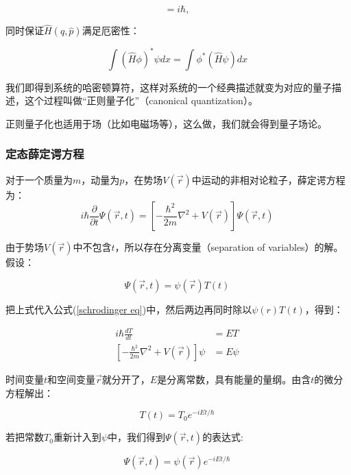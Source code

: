 \begin{equation}
[\hat x, \hat p] = i \hbar ,~
\end{equation}

同时保证$\hat H (\hat q,\hat p)$满足厄密性：

\begin{equation}
\int (\hat H \phi)^* \psi dx = \int \phi^* (\hat H \psi) dx~
\end{equation}

我们即得到系统的哈密顿算符，这样对系统的一个经典描述就变为对应的量子描述，这个过程叫做“正则量子化”（canonical quantization）。

正则量子化也适用于场（比如电磁场等），这么做，我们就会得到量子场论。

\subsubsection{定态薛定谔方程}

对于一个质量为$m$，动量为$p$，在势场$V(\vec
r)$中运动的非相对论粒子，薛定谔方程为：
\begin{equation}
i\hbar \frac{\partial}{\partial t} \Psi(\vec{r}, t) = \left[ -\frac{\hbar^2}{2m} \nabla^2 + V(\vec{r}) \right] \Psi(\vec{r}, t) \tag{217}~
\end{equation}

由于势场$V(\vec r)$中不包含$t$，所以存在分离变量（separation of variables）的解。假设：

\begin{equation}
\Psi(\vec r,t)=\psi(\vec r)T(t)~
\end{equation}

把上式代入公式(\ref{schrodinger eq})中，然后两边再同时除以$\psi(r)T(t)$，得到：

\begin{align}
  i \hbar \frac{dT}{dt} &= E T \\
  \left[ - \frac{\hbar^2}{2m}\nabla^2 + V(\vec r) \right] \psi &= E \psi~
\end{align}

时间变量$t$和空间变量$\vec r$就分开了，$E$是分离常数，具有能量的量纲。由含$t$的微分方程解出：

\begin{equation}
T(t) = T_0 e^{-iEt/\hbar}~
\end{equation}

若把常数$T_0$重新计入到$\psi$中，我们得到$\Psi(\vec r,t)$的表达式:

\begin{equation}
\Psi(\vec r,t)=\psi(\vec r) e^{-iEt/\hbar}~
\end{equation}

